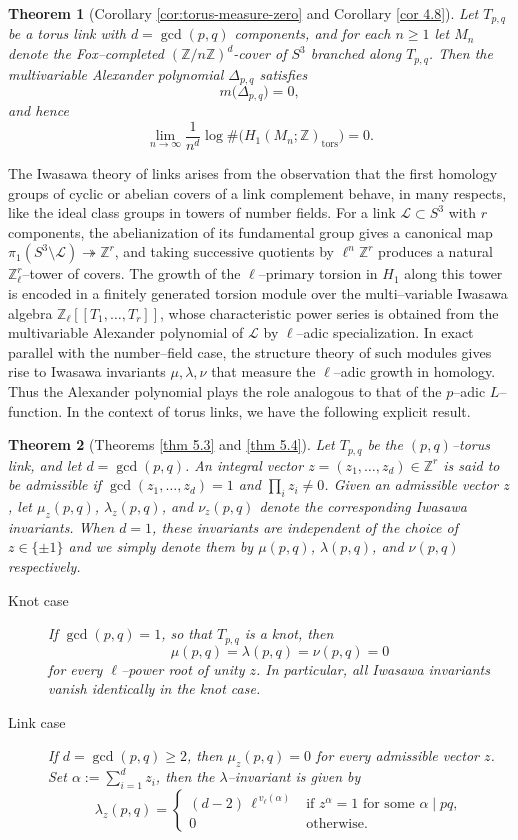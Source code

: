 \documentclass[table]{amsart}
\newtheorem{lthm}{Theorem}
\newcommand{\Z}{\mathbb{Z}}
\newcommand{\cL}{\mathcal{L}}
\newcommand{\op}[1]{\operatorname{#1}}
\numberwithin{equation}{section}
\begin{document}
\begin{lthm}[Corollary \ref{cor:torus-measure-zero} and Corollary \ref{cor 4.8}]
Let $T_{p,q}$ be a torus link with $d=\gcd(p,q)$ components, and for each $n\ge1$ let $M_n$ denote the Fox–completed $(\Z/n\Z)^d$-cover of $S^3$ branched along $T_{p,q}$. Then the multivariable Alexander polynomial $\Delta_{p,q}$ satisfies
\[
m\big(\Delta_{p,q}\big)=0,
\]
and hence
\[
\lim_{n\to\infty}\frac{1}{n^d}\log\#\bigl(H_1(M_n;\Z)_{\mathrm{tors}}\bigr)=0.
\]
\end{lthm}
The Iwasawa theory of links arises from the observation that the first homology groups of cyclic or abelian covers of a link complement behave, in many respects, like the ideal class groups in towers of number fields. For a link $\cL\subset S^3$ with $r$ components, the abelianization of its fundamental group gives a canonical map $\pi_1(S^3\setminus \cL)\twoheadrightarrow \Z^r$, and taking successive quotients by $\ell^n\Z^r$ produces a natural $\Z_\ell^r$–tower of covers. The growth of the $\ell$–primary torsion in $H_1$ along this tower is encoded in a finitely generated torsion module over the multi–variable Iwasawa algebra $\Z_\ell[[T_1,\dots,T_r]]$, whose characteristic power series is obtained from the multivariable Alexander polynomial of $\cL$ by $\ell$–adic specialization. In exact parallel with the number–field case, the structure theory of such modules gives rise to Iwasawa invariants $\mu, \lambda, \nu$ that measure the $\ell$–adic growth in homology. Thus the Alexander polynomial plays the role analogous to that of the $p$–adic $L$–function. In the context of torus links, we have the following explicit result.
\begin{lthm}[Theorems \ref{thm 5.3} and \ref{thm 5.4}]
Let $T_{p,q}$ be the $(p,q)$–torus link, and let $d=\gcd(p,q)$. An integral vector $z=(z_1,\dots, z_d)\in \Z^r$ is said to be \emph{admissible} if $\op{gcd}(z_1,\dots, z_d)=1$ and $\prod_i z_i\neq 0$. Given an admissible vector $z$, let $\mu_z(p,q)$, $\lambda_z(p,q)$, and $\nu_z(p,q)$ denote the corresponding Iwasawa invariants. When $d=1$, these invariants are independent of the choice of $z\in\{\pm 1\}$ and we simply denote them by $\mu(p,q)$, $\lambda(p,q)$, and $\nu(p,q)$ respectively. 
\begin{description} \item[Knot case]If $\gcd(p,q)=1$, so that $T_{p,q}$ is a knot, then
\[
\mu(p,q)=\lambda(p,q)=\nu(p,q)=0
\]
for every $\ell$–power root of unity $z$. In particular, all Iwasawa invariants vanish identically in the knot case.
\item[Link case] If $d=\gcd(p,q)\ge2$, then $\mu_z(p,q)=0$ for every admissible vector $z$. Set $\alpha:=\sum_{i=1}^d z_i$, then the $\lambda$–invariant is given by
\[
\lambda_z(p,q)=
\begin{cases}
(d-2)\,\ell^{\,v_\ell(\alpha)}  & \text{if } z^\alpha=1 \text{ for some } \alpha\mid pq,\\[4pt]
0 & \text{otherwise}.
\end{cases}
\]
\end{description}
\end{lthm}
\end{document}
